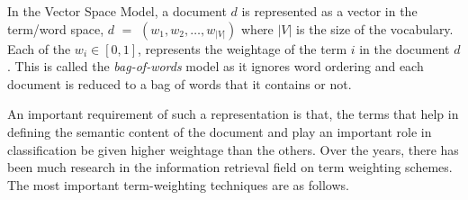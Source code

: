 In the Vector Space Model, a document $d$ is represented as a vector in the term/word space, $d$ $=$ $(w_{1}, w_{2}, \ldots, w_{|V|})$ where $|V|$ is the size of the vocabulary. Each of the $w_{i} \in \left[0,1\right]$, represents the weightage of the term $i$ in the document $d$. This is called the \emph{bag-of-words} model as it ignores word ordering and each document is reduced to a bag of words that it contains or not. 

An important requirement of such a representation is that, the terms that help in defining the semantic content of the document and play an important role in classification be given higher weightage than the others. Over the years, there has been much research in the information retrieval field on term weighting schemes. The most important term-weighting techniques are as follows.

